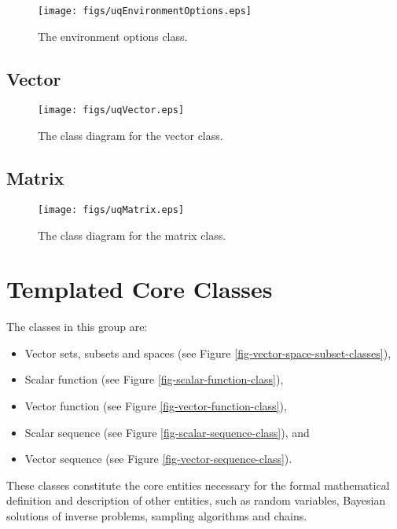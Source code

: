 \begin{figure}[h!]
\begin{center}
\texttt{[image: figs/uqEnvironmentOptions.eps]}
\end{center}
\caption{
The environment options class.
}
\label{fig-env-options-class}
\end{figure}

\clearpage
\subsection{Vector}

\begin{figure}[h!]
\centerline{
\texttt{[image: figs/uqVector.eps]}
}
\caption{
The class diagram for the vector class.
}
\label{fig-vector-class}
\end{figure}

\clearpage
\subsection{Matrix}

\begin{figure}[h!]
\centerline{
\texttt{[image: figs/uqMatrix.eps]}
}
\caption{
The class diagram for the matrix class.
}
\label{fig-matrix-class}
\end{figure}

\clearpage
\section{Templated Core Classes}

The classes in this group are:
\begin{itemize}
\item Vector sets, subsets and spaces (see Figure \ref{fig-vector-space-subset-classes}),
\item Scalar function (see Figure \ref{fig-scalar-function-class}),
\item Vector function (see Figure \ref{fig-vector-function-class}),
\item Scalar sequence (see Figure \ref{fig-scalar-sequence-class}), and
\item Vector sequence (see Figure \ref{fig-vector-sequence-class}).
\end{itemize}
These classes constitute the core entities necessary for the formal
mathematical definition and description of other entities, such as
random variables, Bayesian solutions of inverse problems, sampling algorithms and chains.

